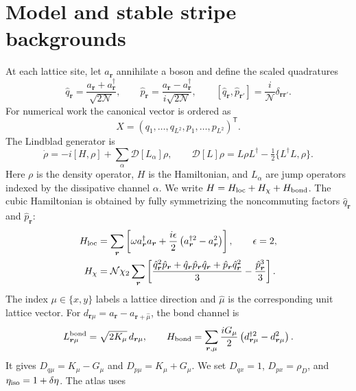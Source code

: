 \documentclass[aps,prl,twocolumn,superscriptaddress,nofootinbib,floatfix]{revtex4-2}
\newcommand{\Diss}{\mathcal D}
\newcommand{\cN}{\mathcal N}
\begin{document}
\section{Model and stable stripe backgrounds}
At each lattice site, let $a_{\bm r}$ annihilate a boson and define the scaled quadratures
\begin{equation}
 \hat q_{\bm r}=\frac{a_{\bm r}+a_{\bm r}^\dagger}{\sqrt{2\cN}},
 \qquad
 \hat p_{\bm r}=\frac{a_{\bm r}-a_{\bm r}^\dagger}{i\sqrt{2\cN}},
 \qquad
 [\hat q_{\bm r},\hat p_{\bm r'}]=\frac{i}{\cN}\delta_{\bm r\bm r'}.
 \label{eq:scaledqp}
\end{equation}
For numerical work the canonical vector is ordered as
\begin{equation}
 X=(q_1,\ldots,q_{L^2},p_1,\ldots,p_{L^2})^{\mathsf T}.
 \label{eq:canonicalOrderingS}
\end{equation}
The Lindblad generator is
\begin{equation}
 \dot\rho=-i[H,\rho]+\sum_\alpha\Diss[L_\alpha]\rho,
 \qquad
 \Diss[L]\rho=L\rho L^\dagger-\tfrac12\{L^\dagger L,\rho\}.
 \label{eq:masterS}
\end{equation}
Here $\rho$ is the density operator, $H$ is the Hamiltonian, and $L_\alpha$ are jump operators indexed by the dissipative channel $\alpha$. We write $H=H_{\rm loc}+H_\chi+H_{\rm bond}$. The cubic Hamiltonian is obtained by fully symmetrizing the noncommuting factors $\hat q_{\bm r}$ and $\hat p_{\bm r}$:
\begin{align}
 H_{\rm loc}&=\sum_{\bm r}\left[\omega a_{\bm r}^\dagger a_{\bm r}
 +\frac{i\epsilon}{2}\left(a_{\bm r}^{\dagger2}-a_{\bm r}^2\right)\right],
 \qquad \epsilon=2,\nonumber\\
 H_\chi&=\cN\chi_2\sum_{\bm r}\left[
 \frac{\hat q_{\bm r}^{2}\hat p_{\bm r}+\hat q_{\bm r}\hat p_{\bm r}\hat q_{\bm r}+\hat p_{\bm r}\hat q_{\bm r}^{2}}{3}
 -\frac{\hat p_{\bm r}^{3}}{3}\right].
 \label{eq:HlocalS}
\end{align}
The index $\mu\in\{x,y\}$ labels a lattice direction and $\hat\mu$ is the corresponding unit lattice vector. For $d_{\bm r\mu}=a_{\bm r}-a_{\bm r+\hat\mu}$, the bond channel is
\begin{align}
 L_{\bm r\mu}^{\rm bond}=\sqrt{2K_\mu}\,d_{\bm r\mu},\qquad
 H_{\rm bond}=\sum_{\bm r,\mu}\frac{iG_\mu}{2}
 \left(d_{\bm r\mu}^{\dagger2}-d_{\bm r\mu}^{2}\right).
 \label{eq:bondS}
\end{align}
It gives $D_{q\mu}=K_\mu-G_\mu$ and $D_{p\mu}=K_\mu+G_\mu$. We set $D_{qx}=1$, $D_{px}=\rho_D$, and $\eta_{\rm iso}=1+\delta\eta$. The atlas uses
\end{document}

